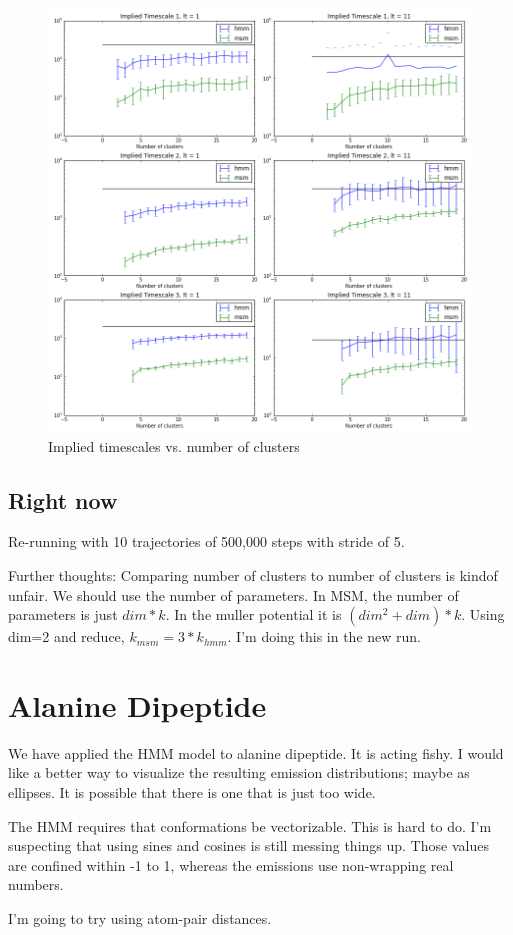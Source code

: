 \documentclass[10pt]{article}
\begin{document}
\begin{figure}[htbp!]
	\centering
	\includegraphics[width=1.0\textwidth]{its_vs_k.png}
	\caption{Implied timescales vs. number of clusters}
	\label{its_vs_k}
\end{figure}

\subsection{Right now}
Re-running with 10 trajectories of 500,000 steps with stride of 5.

Further thoughts: Comparing number of clusters to number of clusters
is kindof unfair. We should use the number of parameters. In MSM, the number
of parameters is just $dim*k$. In the muller potential it is $(dim^2 + dim)*k$.
Using dim=2 and reduce, $k_{msm} = 3*k_{hmm}$. I'm doing this in the new run.

\section{Alanine Dipeptide}
We have applied the HMM model to alanine dipeptide. It is acting fishy.
I would like a better way to visualize the resulting emission distributions;
maybe as ellipses. It is possible that there is one that is just too wide.

The HMM requires that conformations be vectorizable. This is hard to do. I'm suspecting
that using sines and cosines is still messing things up. Those values are confined within
-1 to 1, whereas the emissions use non-wrapping real numbers.

I'm going to try using atom-pair distances.
\end{document}
